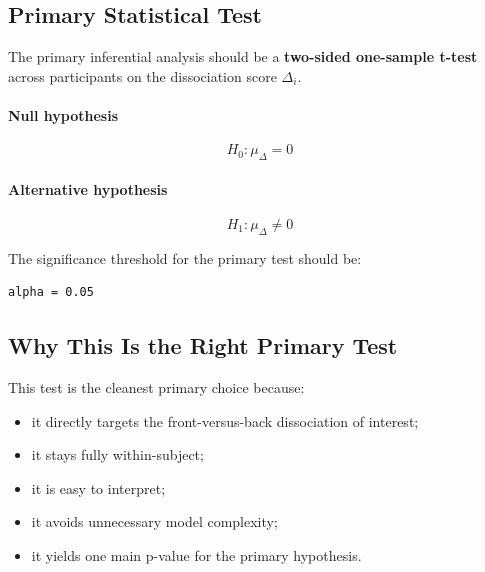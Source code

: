 \subsection{Primary Statistical Test}
The primary inferential analysis should be a \textbf{two-sided one-sample t-test} across participants on
the dissociation score \(\Delta_i\).

\paragraph{Null hypothesis}
\begin{equation}
H_0: \mu_{\Delta} = 0
\end{equation}

\paragraph{Alternative hypothesis}
\begin{equation}
H_1: \mu_{\Delta} \neq 0
\end{equation}

The significance threshold for the primary test should be:
\begin{verbatim}
alpha = 0.05
\end{verbatim}

\subsection{Why This Is the Right Primary Test}
This test is the cleanest primary choice because:
\begin{itemize}
    \item it directly targets the front-versus-back dissociation of interest;
    \item it stays fully within-subject;
    \item it is easy to interpret;
    \item it avoids unnecessary model complexity;
    \item it yields one main p-value for the primary hypothesis.
\end{itemize}

